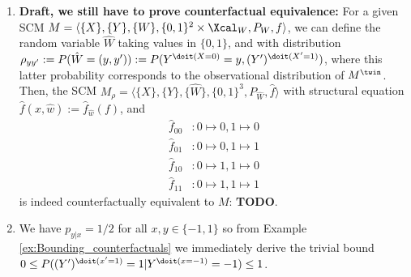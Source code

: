 \begin{enumerate}
\begin{gradedsolution}
\begin{enumerate}
	Assuming that the internal coin toss happens each time already before the coin is put in, this means that it is already pre-determined whether the coin will come out heads or tails (implementation 1) or whether it will be flipped along the way (second model), meaning that the twinned SCM models counterfactuals correctly.
	\item \textbf{Draft, we still have to prove counterfactual equivalence:} For a given SCM $M = \langle\{X\}, \{Y\}, \{W\}, \{0,1\}^2\times \Xcal_W, P_W, f\rangle$, we can define the random variable $\hat{W}$ taking values in $\{0,1\}$, and with distribution $\rho_{yy'} := P(\hat{W} = (y,y')) := P(Y^{\doit(X=0)}=y, (Y')^{\doit(X'=1)})$, where this latter probability corresponds to the observational distribution of $M^\twin$. Then, the SCM $M_\rho = \langle\{X\}, \{Y\}, \{\hat{W}\}, \{0,1\}^3, P_{\hat{W}}, \hat{f}\rangle$ with structural equation $\hat{f}(x, \hat{w}) := \hat{f}_{\hat{w}}(f)$, and
 	\begin{align*}
		\hat{f}_{00}&: 0 \mapsto 0, 1\mapsto 0 \\
		\hat{f}_{01}&: 0 \mapsto 0, 1\mapsto 1 \\
		\hat{f}_{10}&: 0 \mapsto 1, 1\mapsto 0 \\
		\hat{f}_{11}&: 0 \mapsto 1, 1\mapsto 1
	 \end{align*}
	is indeed counterfactually equivalent to $M$: \textbf{TODO}.
	\item We have $p_{y|x}=1/2$ for all $x, y\in\{-1,1\}$ so from Example \ref*{ex:Bounding_counterfactuals} we immediately derive the trivial bound $0 \leq P((Y')^{\doit(x'=1)}=1|Y^{\doit(x=-1)}=-1) \leq 1$. 
\end{enumerate}
\end{gradedsolution}



\end{enumerate}
